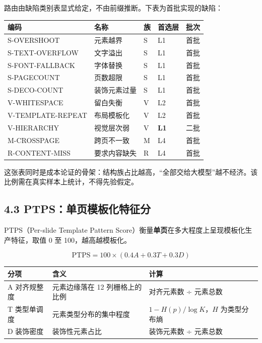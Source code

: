 \documentclass[
  11pt,
]{article}
\newcounter{none} %
\begin{document}
路由由缺陷类别表显式给定，不由前缀推断。下表为首批实现的缺陷：

{\def\LTcaptype{none} %
\begin{longtable}[]{@{}lllll@{}}
\toprule\noalign{}
编码 & 名称 & 族 & 首选层 & 批次 \\
\midrule\noalign{}
\endhead
\bottomrule\noalign{}
\endlastfoot
S-OVERSHOOT & 元素越界 & S & L1 & 首批 \\
S-TEXT-OVERFLOW & 文字溢出 & S & L1 & 首批 \\
S-FONT-FALLBACK & 字体替换 & S & L1 & 首批 \\
S-PAGECOUNT & 页数超限 & S & L1 & 首批 \\
S-DECO-COUNT & 装饰元素过量 & S & L1 & 首批 \\
V-WHITESPACE & 留白失衡 & V & L2 & 首批 \\
V-TEMPLATE-REPEAT & 布局模板化 & V & L2 & 首批 \\
V-HIERARCHY & 视觉层次弱 & V & \textbf{L1} & 二批 \\
M-CROSSPAGE & 跨页不一致 & M & L4 & 首批 \\
R-CONTENT-MISS & 要求内容缺失 & R & L4 & 首批 \\
\end{longtable}
}

这张表同时是成本论证的骨架：结构族占比越高，``全部交给大模型''越不经济。该比例需在真实样本上统计，不得先验假定。

\subsection{4.3
PTPS：单页模板化特征分}\label{ptpsux5355ux9875ux6a21ux677fux5316ux7279ux5f81ux5206}

PTPS（Per-slide Template Pattern
Score）衡量\textbf{单页}在多大程度上呈现模板化生产特征，取值 0 至
100，越高越模板化。

\[\mathrm{PTPS} = 100 \times (0.4A + 0.3T + 0.3D)\]

{\def\LTcaptype{none} %
\begin{longtable}[]{@{}
  >{\raggedright\arraybackslash}p{}
  >{\raggedright\arraybackslash}p{}
  >{\raggedright\arraybackslash}p{}@{}}
\toprule\noalign{}
\begin{minipage}[b]{\linewidth}\raggedright
分项
\end{minipage} & \begin{minipage}[b]{\linewidth}\raggedright
含义
\end{minipage} & \begin{minipage}[b]{\linewidth}\raggedright
计算
\end{minipage} \\
\midrule\noalign{}
\endhead
\bottomrule\noalign{}
\endlastfoot
A 对齐规整度 & 元素边缘落在 12 列栅格上的比例 & 对齐元素数 ÷ 元素总数 \\
T 类型单调度 & 元素类型分布的集中程度 & \(1 - H(p)/\log K\)，\(H\)
为类型分布熵 \\
D 装饰密度 & 装饰性元素占比 & 装饰元素数 ÷ 元素总数 \\
\end{longtable}
}
\end{document}
